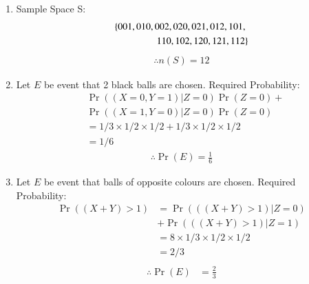 \documentclass[journal,12pt,twocolumn]{IEEEtran}
\providecommand{\pr}[1]{\ensuremath{\Pr\left(#1\right)}}
\begin{document}
 
\begin{enumerate}[label =(\alph*)]
\item Sample Space S:
\begin{align}
\left\{001,010,002,020,021,012,101,\right.\\
 \left.110,102,120,121,112\right\} 
\end{align} 
\begin{align}
    \therefore n(S) = 12
\end{align}
\item Let $E$ be event that 2 black balls are chosen.
Required Probability:
\begin{align}
&\pr{ (X =0,Y=1) | Z=0}\pr{Z=0} +\\ \nonumber
&\pr{  (X =1,Y=0) | Z=0}\pr{Z=0}\\ 
&= 1/3\times1/2\times1/2 + 1/3\times1/2\times1/2\\
&= 1/6
\end{align}
\begin{align}
\therefore \pr{E} = \frac{1}{6} 
\end{align}
\item Let $E$ be event that balls of opposite colours are chosen.
Required Probability:
\begin{align}
\pr{(X+Y)>1} &=\pr{((X+Y)>1)|Z =0}  \\ \nonumber
& + \pr{((X+Y)>1)|Z=1} \\ 
&= 8\times1/3\times1/2\times1/2\\
&= 2/3\\
\end{align}
\begin{align}
\therefore \pr{E} &= \frac{2}{3}
\end{align}
\end{enumerate}
\end{document}
